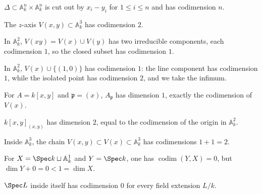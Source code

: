 \begin{example}\label{ex:vi31-10}
$\Delta\subset\mathbb A^n_k\times\mathbb A^n_k$ is cut out by $x_i-y_i$ for $1\le i\le n$ and has codimension $n$.
\end{example}

\begin{example}\label{ex:vi31-11}
The $z$-axis $V(x,y)\subset\mathbb A^3_k$ has codimension $2$.
\end{example}

\begin{example}\label{ex:vi31-12}
In $\mathbb A^2_k$, $V(xy)=V(x)\cup V(y)$ has two irreducible components, each codimension $1$, so the closed subset has codimension $1$.
\end{example}

\begin{example}\label{ex:vi31-13}
In $\mathbb A^2_k$, $V(x)\cup\{(1,0)\}$ has codimension $1$: the line component has codimension $1$, while the isolated point has codimension $2$, and we take the infimum.
\end{example}

\begin{example}\label{ex:vi31-14}
For $A=k[x,y]$ and $\mathfrak p=(x)$, $A_{\mathfrak p}$ has dimension $1$, exactly the codimension of $V(x)$.
\end{example}

\begin{example}\label{ex:vi31-15}
$k[x,y]_{(x,y)}$ has dimension $2$, equal to the codimension of the origin in $\mathbb A^2_k$.
\end{example}

\begin{example}\label{ex:vi31-16}
Inside $\mathbb A^3_k$, the chain $V(x,y)\subset V(x)\subset\mathbb A^3_k$ has codimensions $1+1=2$.
\end{example}

\begin{example}\label{ex:vi31-17}
For $X=\Spec k\sqcup\mathbb A^1_k$ and $Y=\Spec k$, one has $\operatorname{codim}(Y,X)=0$, but $\dim Y+0=0<1=\dim X$.
\end{example}

\begin{example}\label{ex:vi31-18}
$\Spec L$ inside itself has codimension $0$ for every field extension $L/k$.
\end{example}

